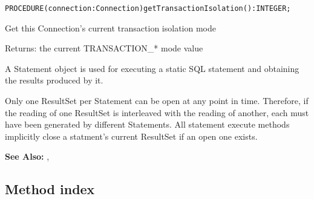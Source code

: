 \verb'PROCEDURE(connection:Connection)getTransactionIsolation():INTEGER;'

     Get this Connection's current transaction isolation mode 

     {Returns:} 
          the current TRANSACTION\_* mode value 


\renewcommand{\CurClass}{Statement}
\Class{}

A Statement object is used for executing a static SQL statement and obtaining the results produced by it. 

Only one ResultSet per Statement can be open at any point in time. Therefore, if the reading of one ResultSet is interleaved with the reading
of another, each must have been generated by different Statements. All statement execute methods implicitly close a statment's current
ResultSet if an open one exists. 

{\bf See Also:} 
     ,  

\subsection{Method index}

